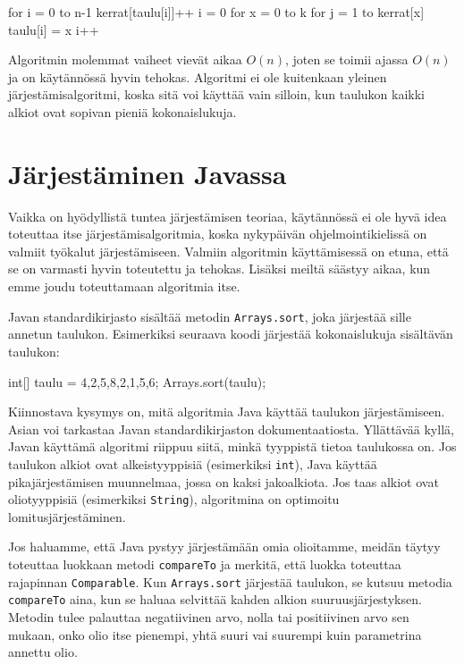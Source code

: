 \begin{code}
for i = 0 to n-1
    kerrat[taulu[i]]++
i = 0
for x = 0 to k
    for j = 1 to kerrat[x]
        taulu[i] = x
        i++
\end{code}

Algoritmin molemmat vaiheet vievät aikaa $O(n)$,
joten se toimii ajassa $O(n)$ ja on käytännössä hyvin tehokas.
Algoritmi ei ole kuitenkaan yleinen järjestämisalgoritmi,
koska sitä voi käyttää vain silloin,
kun taulukon kaikki alkiot ovat sopivan pieniä kokonaislukuja.


\section{Järjestäminen Javassa}

Vaikka on hyödyllistä tuntea järjestämisen teoriaa,
käytännössä ei ole hyvä idea toteuttaa itse
järjestämisalgoritmia, koska nykypäivän ohjelmointikielissä
on valmiit työkalut järjestämiseen.
Valmiin algoritmin käyttämisessä on etuna,
että se on varmasti hyvin toteutettu ja tehokas.
Lisäksi meiltä säästyy aikaa, kun emme joudu
toteuttamaan algoritmia itse.

Javan standardikirjasto sisältää metodin \texttt{Arrays.sort},
joka järjestää sille annetun taulukon.
Esimerkiksi seuraava koodi järjestää kokonaislukuja
sisältävän taulukon:

\begin{code}
int[] taulu = {4,2,5,8,2,1,5,6};
Arrays.sort(taulu);
\end{code}

Kiinnostava kysymys on, mitä algoritmia Java käyttää
taulukon järjes\-tämiseen.
Asian voi tarkastaa Javan standardikirjaston
dokumentaatiosta.
Yllättävää kyllä, Javan käyttämä algoritmi riippuu siitä,
minkä tyyppistä tietoa taulukossa on.
Jos taulukon alkiot ovat alkeistyyppisiä
(esimerkiksi \texttt{int}), Java käyttää 
pikajärjestämisen muunnelmaa,
jossa on kaksi jakoalkiota.
Jos taas alkiot ovat oliotyyppisiä
(esimerkiksi \texttt{String}),
algoritmina on optimoitu lomitusjärjestäminen.

Jos haluamme, että Java pystyy järjestämään omia olioitamme,
meidän täytyy toteuttaa luokkaan metodi \texttt{compareTo} ja
merkitä, että luokka toteuttaa rajapinnan \texttt{Comparable}.
Kun \texttt{Arrays.sort} järjestää taulukon,
se kutsuu metodia \texttt{compareTo} aina, kun se haluaa selvittää
kahden alkion suuruusjärjestyksen.
Metodin tulee palauttaa negatiivinen arvo, nolla tai positiivinen arvo
sen mukaan, onko olio itse pienempi, yhtä suuri vai suurempi
kuin parametrina annettu olio.

